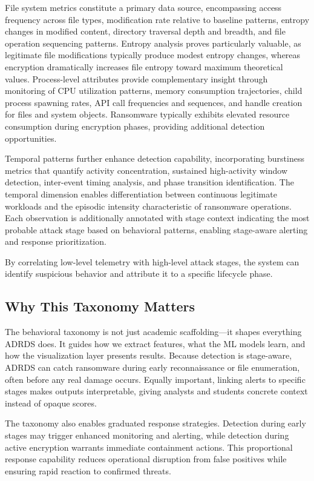 File system metrics constitute a primary data source, encompassing access frequency across file types, modification rate relative to baseline patterns, entropy changes in modified content, directory traversal depth and breadth, and file operation sequencing patterns. Entropy analysis proves particularly valuable, as legitimate file modifications typically produce modest entropy changes, whereas encryption dramatically increases file entropy toward maximum theoretical values. Process-level attributes provide complementary insight through monitoring of CPU utilization patterns, memory consumption trajectories, child process spawning rates, API call frequencies and sequences, and handle creation for files and system objects. Ransomware typically exhibits elevated resource consumption during encryption phases, providing additional detection opportunities.

Temporal patterns further enhance detection capability, incorporating burstiness metrics that quantify activity concentration, sustained high-activity window detection, inter-event timing analysis, and phase transition identification. The temporal dimension enables differentiation between continuous legitimate workloads and the episodic intensity characteristic of ransomware operations. Each observation is additionally annotated with stage context indicating the most probable attack stage based on behavioral patterns, enabling stage-aware alerting and response prioritization.

By correlating low-level telemetry with high-level attack stages, the system can identify suspicious behavior and attribute it to a specific lifecycle phase.

\subsection{Why This Taxonomy Matters}

The behavioral taxonomy is not just academic scaffolding—it shapes everything ADRDS does. It guides how we extract features, what the ML models learn, and how the visualization layer presents results. Because detection is stage-aware, ADRDS can catch ransomware during early reconnaissance or file enumeration, often before any real damage occurs. Equally important, linking alerts to specific stages makes outputs interpretable, giving analysts and students concrete context instead of opaque scores.

The taxonomy also enables graduated response strategies. Detection during early stages may trigger enhanced monitoring and alerting, while detection during active encryption warrants immediate containment actions. This proportional response capability reduces operational disruption from false positives while ensuring rapid reaction to confirmed threats.
